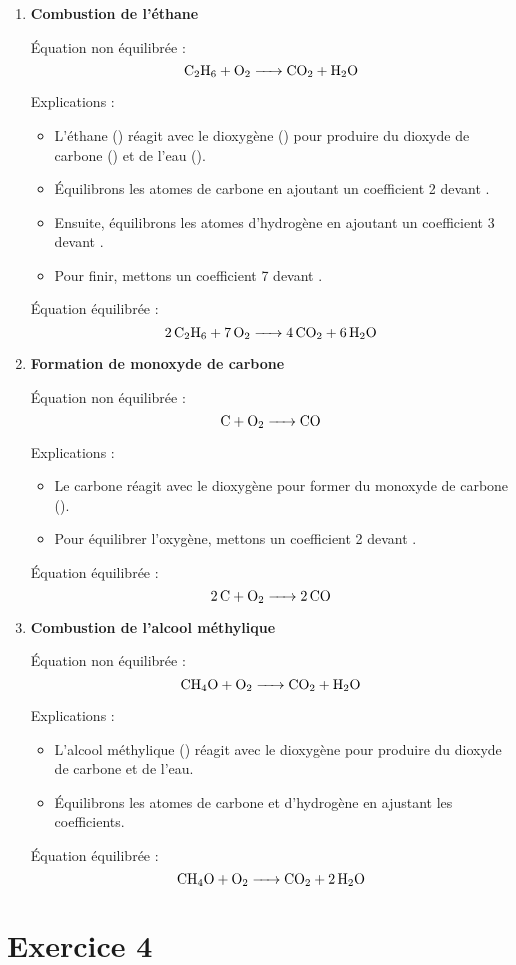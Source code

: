 \documentclass[a4paper,12pt]{article}
\begin{document}
\begin{enumerate}
  \item \textbf{Combustion de l'éthane}

  Équation non équilibrée :
  \[
  \ce{C2H6 + O2 -> CO2 + H2O}
  \]

  Explications :
  \begin{itemize}
      \item L'éthane () réagit avec le dioxygène () pour produire du dioxyde de carbone () et de l'eau ().
      \item Équilibrons les atomes de carbone en ajoutant un coefficient 2 devant .
      \item Ensuite, équilibrons les atomes d'hydrogène en ajoutant un coefficient 3 devant .
      \item Pour finir, mettons un coefficient 7 devant .
  \end{itemize}
  Équation équilibrée :
  \[
  \ce{2 C2H6 + 7 O2 -> 4 CO2 + 6 H2O}
  \]

  \item \textbf{Formation de monoxyde de carbone}

  Équation non équilibrée :
  \[
  \ce{C + O2 -> CO}
  \]

  Explications :
  \begin{itemize}
      \item Le carbone réagit avec le dioxygène pour former du monoxyde de carbone ().
      \item Pour équilibrer l'oxygène, mettons un coefficient 2 devant .
  \end{itemize}
  Équation équilibrée :
  \[
  \ce{2 C + O2 -> 2 CO}
  \]

  \item \textbf{Combustion de l'alcool méthylique}

  Équation non équilibrée :
  \[
  \ce{CH4O + O2 -> CO2 + H2O}
  \]

  Explications :
  \begin{itemize}
      \item L'alcool méthylique () réagit avec le dioxygène pour produire du dioxyde de carbone et de l'eau.
      \item Équilibrons les atomes de carbone et d'hydrogène en ajustant les coefficients.
  \end{itemize}
  Équation équilibrée :
  \[
  \ce{CH4O + O2 -> CO2 + 2 H2O}
  \]

\end{enumerate}
\section{Exercice 4}
\end{document}
